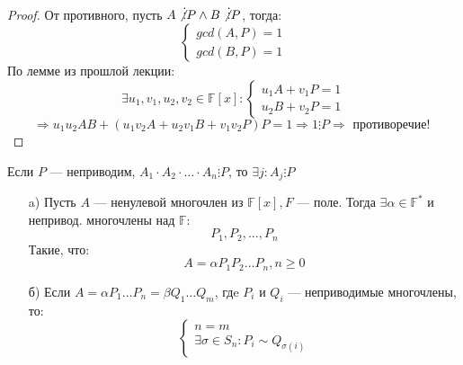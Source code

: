 \begin{proof}
От противного, пусть $A \not\vdots P \land B \not\vdots P$, тогда:
\[
  \begin{cases}
  gcd(A, P) = 1 \\
  gcd(B, P) = 1
  \end{cases}
\]
По лемме из прошлой лекции:
\[
\exists u_1, v_1, u_2, v_2 \in \mathbb{F}[x]\colon \begin{cases}
  u_1 A + v_1 P = 1 \\
  u_2 B + v_2 P = 1
\end{cases}
\]
\[
\Rightarrow u_1 u_2 AB + (u_1 v_2 A + u_2 v_1 B + v_1 v_2 P)P = 1 \Rightarrow 1 \vdots P \Rightarrow \text{ противоречие! }
\]
\end{proof}
\begin{consequence}
  \label{consequence:02_1}
Если $P$ --- неприводим, $A_1 \cdot A_2 \cdot \ldots \cdot A_n \vdots P$, то $\exists j \colon A_j \vdots P$
\end{consequence}
\begin{theorem}
\label{theorem:02_1}
\begin{itemize}
  \item [a) ] Пусть $A$ --- ненулевой многочлен из $\mathbb{F}[x], F$  --- поле. Тогда $\exists \alpha \in \mathbb{F}^{*}$ и непривод. многочлены над $\mathbb{F}$:
  \[
    P_1, P_2, \ldots, P_n
  \]
  Такие, что:
  \[
  A = \alpha P_1 P_2 \ldots P_n, n \geq 0
  \]
\item [б) ] Если $A = \alpha P_1 \ldots P_n = \beta Q_1 \ldots Q_m$, гдe $P_i$ и $Q_i$ --- неприводимые многочлены, то:
  \[
  \begin{cases}
  n = m \\
  \exists \sigma \in S_n \colon P_i \sim Q_{\sigma(i)}
  \end{cases}
  \]
\end{itemize}
\end{theorem}
